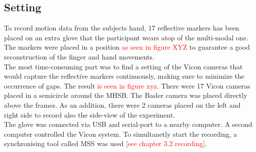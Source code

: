 \subsection{Setting}
To record motion data from the subjects hand, 17 reflective markers has been placed on an extra glove that the participant wears atop of the multi-modal one. The markers were placed in a position \textcolor{red}{as seen in figure XYZ} to guarantee a good reconstruction of the finger and hand movements.\\
The most time-consuming part was to find a setting of the Vicon cameras that would capture the reflective markers continuously, making sure to minimize the occurrence of gaps. The result \textcolor{red}{is seen in figure xyz}. There were 17 Vicon cameras placed in a semicircle around the MHSB. The Basler camera was placed directly above the frames. As an addition, there were 2 cameras placed on the left and right side to record also the side-view of the experiment.\\
The glove was connected via USB and serial-port to a nearby computer. A second computer controlled the Vicon system. To simultanetly start the recording, a synchronising tool called MSS was used \textcolor{red}{[see chapter 3.2 recording]}.


 